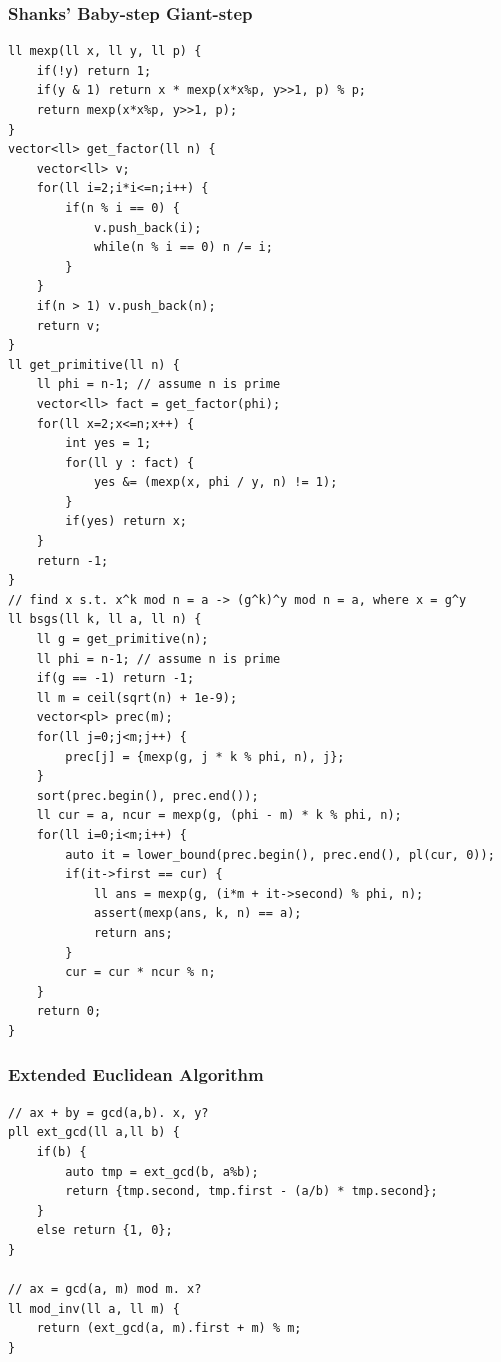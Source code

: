 \documentclass[landscape, 8pt, a4paper, oneside, twocolumn]{extarticle}
\begin{document}
\subsubsection{Shanks' Baby-step Giant-step}
\begin{verbatim}
ll mexp(ll x, ll y, ll p) {
    if(!y) return 1;
    if(y & 1) return x * mexp(x*x%p, y>>1, p) % p;
    return mexp(x*x%p, y>>1, p);
}
vector<ll> get_factor(ll n) {
    vector<ll> v;
    for(ll i=2;i*i<=n;i++) {
        if(n % i == 0) {
            v.push_back(i);
            while(n % i == 0) n /= i;
        }
    }
    if(n > 1) v.push_back(n);
    return v;
}
ll get_primitive(ll n) {
    ll phi = n-1; // assume n is prime
    vector<ll> fact = get_factor(phi);
    for(ll x=2;x<=n;x++) {
        int yes = 1;
        for(ll y : fact) {
            yes &= (mexp(x, phi / y, n) != 1);
        }
        if(yes) return x;
    }
    return -1;
}
// find x s.t. x^k mod n = a -> (g^k)^y mod n = a, where x = g^y
ll bsgs(ll k, ll a, ll n) {
    ll g = get_primitive(n);
    ll phi = n-1; // assume n is prime
    if(g == -1) return -1;
    ll m = ceil(sqrt(n) + 1e-9);
    vector<pl> prec(m);
    for(ll j=0;j<m;j++) {
        prec[j] = {mexp(g, j * k % phi, n), j};
    }
    sort(prec.begin(), prec.end());
    ll cur = a, ncur = mexp(g, (phi - m) * k % phi, n);
    for(ll i=0;i<m;i++) {
        auto it = lower_bound(prec.begin(), prec.end(), pl(cur, 0));
        if(it->first == cur) {
            ll ans = mexp(g, (i*m + it->second) % phi, n);
            assert(mexp(ans, k, n) == a);
            return ans;
        }
        cur = cur * ncur % n;
    }
    return 0;
}
\end{verbatim}
\subsubsection{Extended Euclidean Algorithm}
\begin{verbatim}
// ax + by = gcd(a,b). x, y?
pll ext_gcd(ll a,ll b) {
    if(b) {
        auto tmp = ext_gcd(b, a%b);
        return {tmp.second, tmp.first - (a/b) * tmp.second};
    }
    else return {1, 0};
}

// ax = gcd(a, m) mod m. x?
ll mod_inv(ll a, ll m) {
    return (ext_gcd(a, m).first + m) % m;
}
\end{verbatim}
\end{document}
